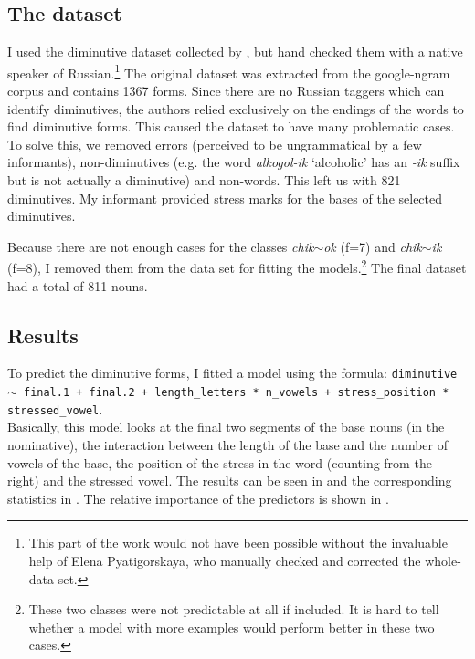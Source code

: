 \subsection{The dataset}
\largerpage
I used the diminutive dataset collected by \textcite{Gouskova.2015}, but hand checked them with a native speaker of Russian.\footnote{This part of the work would not have been possible without the invaluable help of Elena Pyatigorskaya, who manually checked and corrected the whole-data set.} The original dataset was extracted from the google-ngram corpus \autocite{Michel.2011} and contains 1367 forms. Since there are no Russian taggers which can identify diminutives, the authors relied exclusively on the endings of the words to find diminutive forms. This caused the dataset to have many problematic cases. To solve this, we removed errors (perceived to be ungrammatical by a few informants), non-diminutives (e.g. the word \textit{alkogol-ik} `alcoholic' has an \textit{-ik} suffix but is not actually a diminutive) and non-words. This left us with 821 diminutives. My informant provided stress marks for the bases of the selected diminutives.

Because there are not enough cases for the classes \textit{chik$\sim$ok} (f=7) and \textit{chik$\sim$ik} (f=8), I removed them from the data set for fitting the models.\footnote{These two classes were not predictable at all if included. It is hard to tell whether a model with more examples would perform better in these two cases.} The final dataset had a total of 811 nouns.

\subsection{Results}

To predict the diminutive forms, I fitted a model using the formula: \texttt{diminutive $\sim$ final.1 + final.2 + length\_letters * n\_vowels + stress\_position * stressed\_vowel}. \\Basically, this model looks at the final two segments of the base nouns (in the nominative), the interaction between the length of the base and the number of vowels of the base, the position of the stress in the word (counting from the right) and the stressed vowel. The results can be seen in  and the corresponding statistics in . The relative importance of the predictors is shown in .

